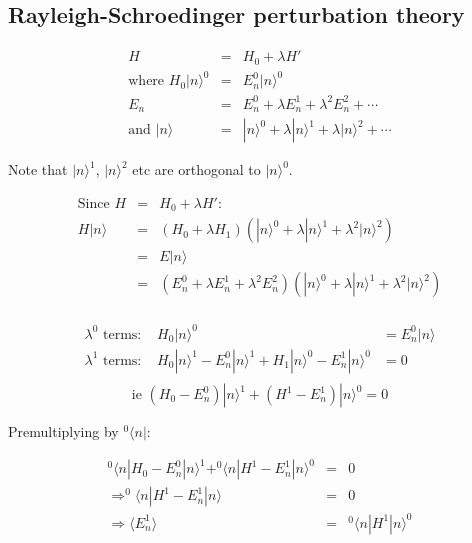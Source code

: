 \subsection{Rayleigh-Schroedinger perturbation theory}

\begin{eqnarray*}
  H & = & H_0 + \lambda H' \\
  \textrm{where } H_0 |n\rangle^0 & = & E^0_n|n\rangle^0 \\
  E_n & = & E^0_n + \lambda E^1_n + \lambda^2 E^2_n + \cdots \\
  \textrm{and } |n\rangle & = & |n\rangle^0 + \lambda|n\rangle^1 + \lambda|n\rangle^2 + \cdots
\end{eqnarray*}

Note that $|n\rangle^1$, $|n\rangle^2$ etc are orthogonal to $|n\rangle^0$.

\begin{eqnarray*}
  \textrm{Since } H & = & H_0 + \lambda H': \\
  H|n\rangle        & = & \left(H_0 + \lambda H_1\right)\left(|n\rangle^0 + \lambda|n\rangle^1 + \lambda^2|n\rangle^2\right) \\
                    & = & E|n\rangle \\
                    & = & \left(E^0_n + \lambda E^1_n + \lambda^2 E^2_n\right)\left( |n\rangle^0 + \lambda |n\rangle^1 + \lambda^2|n\rangle^2 \right) \\
\end{eqnarray*}

\begin{eqnarray*}
  \lambda^0 \textrm{ terms: } & H_0|n\rangle^0 & = E^0_n|n\rangle \\
  \lambda^1 \textrm{ terms: } & H_0|n\rangle^1 - E^0_n|n\rangle^1 + H_1|n\rangle^0 - E_n^1|n\rangle^0 & = 0 \\
\end{eqnarray*}
\[
  \textrm{ie } \left( H_0 -E^0_n \right) |n\rangle^1 + \left( H^1 - E^1_n \right) |n \rangle^0 = 0
\]

Premultiplying by $^0\langle n | :$

\begin{eqnarray*}
  ^0\langle n | H_0 - E_n^0 |n\rangle^1 + ^0\langle n | H^1 - E^1_n|n\rangle^0 & = & 0 \\
  \Rightarrow ^0\langle n|H^1 - E^1_n|n\rangle & = & 0 \\
  \Rightarrow \langle E^1_n\rangle & = & ^0\langle n | H^1 |n\rangle^0
\end{eqnarray*}

